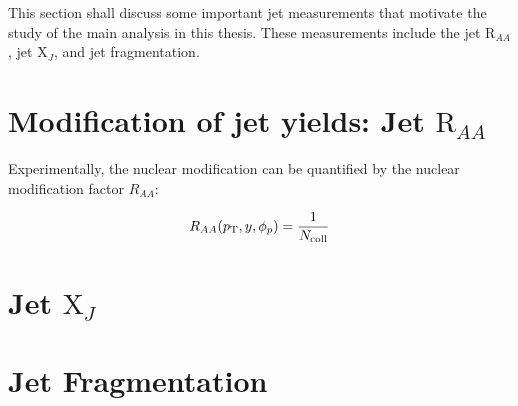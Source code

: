 
This section shall discuss some important jet measurements that motivate the study of the main analysis in this thesis. These measurements include the jet $\mathrm{R}_{AA}$, jet $\mathrm{X}_{J}$, and jet fragmentation. 

\section{Modification of jet yields: Jet $\mathrm{R}_{AA}$}
Experimentally, the nuclear modification can be quantified by the nuclear modification factor $R_{AA}$:

\begin{align}
R_{AA} (\mbox{$p_{\mathrm{T}}$}, y, \phi_p) = \frac{1}{N_{\mathrm{coll}}}
\end{align}



\section{Jet $\mathrm{X}_{J}$}
\section{Jet Fragmentation}



